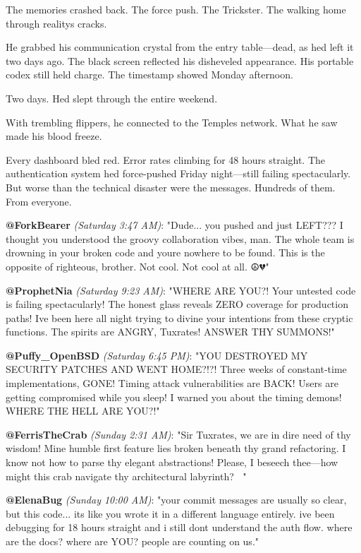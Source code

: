 The memories crashed back. The force push. The Trickster. The walking home through reality\textquotesingle s cracks.

He grabbed his communication crystal from the entry table---dead, as he\textquotesingle d left it two days ago. The black screen reflected his disheveled appearance. His portable codex still held charge. The timestamp showed Monday afternoon.

Two days. He\textquotesingle d slept through the entire weekend.

With trembling flippers, he connected to the Temple\textquotesingle s network. What he saw made his blood freeze.

Every dashboard bled red. Error rates climbing for 48 hours straight. The authentication system he\textquotesingle d force-pushed Friday night---still failing spectacularly. But worse than the technical disaster were the messages. Hundreds of them. From everyone.

\textbf{@ForkBearer} \emph{(Saturday 3:47 AM)}: "Dude... you pushed and just LEFT??? I thought you understood the groovy collaboration vibes, man. The whole team is drowning in your broken code and you\textquotesingle re nowhere to be found. This is the opposite of righteous, brother. Not cool. Not cool at all. ☮️💔"

\textbf{@ProphetNia} \emph{(Saturday 9:23 AM)}: "WHERE ARE YOU?! Your untested code is failing spectacularly! The honest glass reveals ZERO coverage for production paths! I\textquotesingle ve been here all night trying to divine your intentions from these cryptic functions. The spirits are ANGRY, Tuxrates! ANSWER THY SUMMONS!"

\textbf{@Puffy\_OpenBSD} \emph{(Saturday 6:45 PM)}: "YOU DESTROYED MY SECURITY PATCHES AND WENT HOME?!?! Three weeks of constant-time implementations, GONE! Timing attack vulnerabilities are BACK! Users are getting compromised while you sleep! I warned you about the timing demons! WHERE THE HELL ARE YOU?!"

\textbf{@FerrisTheCrab} \emph{(Sunday 2:31 AM)}: "Sir Tuxrates, we are in dire need of thy wisdom! Mine humble first feature lies broken beneath thy grand refactoring. I know not how to parse thy elegant abstractions! Please, I beseech thee---how might this crab navigate thy architectural labyrinth? 🦀😭"

\textbf{@ElenaBug} \emph{(Sunday 10:00 AM)}: "your commit messages are usually so clear, but this code... it\textquotesingle s like you wrote it in a different language entirely. i\textquotesingle ve been debugging for 18 hours straight and i still don\textquotesingle t understand the auth flow. where are the docs? where are YOU? people are counting on us."

